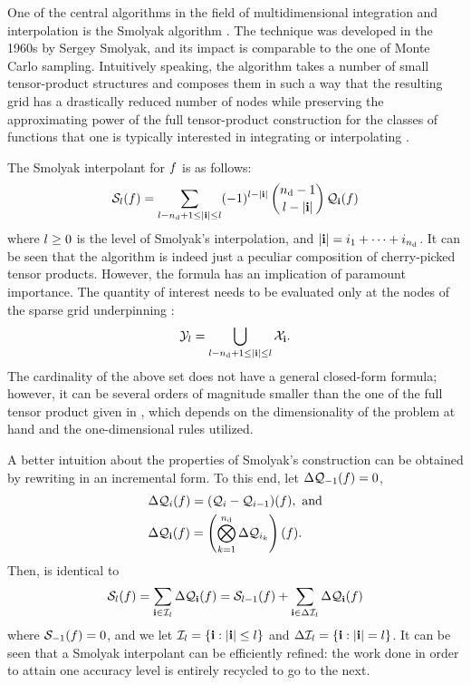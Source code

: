 One of the central algorithms in the field of multidimensional integration and
interpolation is the Smolyak algorithm \cite{smolyak1963}. The technique was
developed in the 1960s by Sergey Smolyak, and its impact is comparable to the
one of Monte Carlo sampling. Intuitively speaking, the algorithm takes a number
of small tensor-product structures and composes them in such a way that the
resulting grid has a drastically reduced number of nodes while preserving the
approximating power of the full tensor-product construction for the classes of
functions that one is typically interested in integrating or interpolating
\cite{klimke2006}.

The Smolyak interpolant for $f$ is as follows:
\begin{equation} \elab{smolyak-original}
  \smolyak{\l}(\f) = \sum_{\l - \nin + 1 \leq |\vi| \leq \l} (-1)^{\l - |\vi|} \, {\nin - 1 \choose \l - |\vi|} \, \tensor{\vi}(\f)
\end{equation}
where $l \geq 0$ is the level of Smolyak's interpolation, and $|\mathbf{i}| = i_1 +
\dots + i_{n_\text{d}}$. It can be seen that the algorithm is indeed just a peculiar
composition of cherry-picked tensor products. However, the formula has an
implication of paramount importance. The quantity of interest needs to be
evaluated only at the nodes of the sparse grid underpinning
:
\begin{equation} \elab{smolyak-grid}
  \Y_l = \bigcup_{\l - \nin + 1 \leq |\vi| \leq \l} \X_\vi.
\end{equation}
The cardinality of the above set does not have a general closed-form formula;
however, it can be several orders of magnitude smaller than the one of the full
tensor product given in , which depends on the
dimensionality of the problem at hand and the one-dimensional rules utilized.

A better intuition about the properties of Smolyak's construction can be
obtained by rewriting  in an incremental form. To this
end, let $\Delta\mathcal{Q}_{-1}(f) = 0$,
\begin{align}
  & \Delta\tensor{i}(\f) = (\tensor{i} - \tensor{i - 1})(\f), \text{ and} \elab{tensor-delta-1d} \\
  & \Delta\tensor{\vi}(\f) = \left( \bigotimes_{k = 1}^\nin \Delta\tensor{i_k} \right)(\f). \nonumber
\end{align}
Then,  is identical to
\begin{equation} \elab{smolyak-incremental}
  \smolyak{\l}(\f) = \sum_{\vi \in \lindex_\l} \Delta\tensor{\vi}(\f) = \smolyak{\l - 1}(\f) + \sum_{\vi \in \Delta\lindex_\l} \Delta\tensor{\vi}(\f)
\end{equation}
where $\mathcal{S}_{-1}(f) = 0$, and we let $\mathcal{I}_l = \{ \mathbf{i}: |\mathbf{i}| \leq l
\}$ and $\Delta\mathcal{I}_l = \{ \mathbf{i}: |\mathbf{i}| = l \}$. It can be seen that a
Smolyak interpolant can be efficiently refined: the work done in order to attain
one accuracy level is entirely recycled to go to the next.

